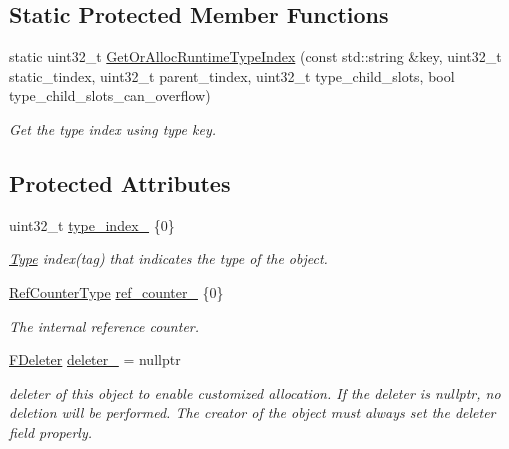 \subsection*{Static Protected Member Functions}
\begin{DoxyCompactItemize}
\item 
static uint32\+\_\+t \hyperlink{classtvm_1_1runtime_1_1Object_a726972ff315c446192df94027ddea032}{Get\+Or\+Alloc\+Runtime\+Type\+Index} (const std\+::string \&key, uint32\+\_\+t static\+\_\+tindex, uint32\+\_\+t parent\+\_\+tindex, uint32\+\_\+t type\+\_\+child\+\_\+slots, bool type\+\_\+child\+\_\+slots\+\_\+can\+\_\+overflow)
\begin{DoxyCompactList}\small\item\em Get the type index using type key. \end{DoxyCompactList}\end{DoxyCompactItemize}
\subsection*{Protected Attributes}
\begin{DoxyCompactItemize}
\item 
uint32\+\_\+t \hyperlink{classtvm_1_1runtime_1_1Object_a4bfc2586cb55f2af47728187b3256255}{type\+\_\+index\+\_\+} \{0\}
\begin{DoxyCompactList}\small\item\em \hyperlink{classtvm_1_1Type}{Type} index(tag) that indicates the type of the object. \end{DoxyCompactList}\item 
\hyperlink{classtvm_1_1runtime_1_1Object_a55549a6c23987890246248682560a03d}{Ref\+Counter\+Type} \hyperlink{classtvm_1_1runtime_1_1Object_a0d492efee331e2239a093f4b2017c10f}{ref\+\_\+counter\+\_\+} \{0\}
\begin{DoxyCompactList}\small\item\em The internal reference counter. \end{DoxyCompactList}\item 
\hyperlink{classtvm_1_1runtime_1_1Object_a9e84841ca982bff376a978ade0132631}{F\+Deleter} \hyperlink{classtvm_1_1runtime_1_1Object_af4407d2b59132e803ff791482dbe0145}{deleter\+\_\+} = nullptr
\begin{DoxyCompactList}\small\item\em deleter of this object to enable customized allocation. If the deleter is nullptr, no deletion will be performed. The creator of the object must always set the deleter field properly. \end{DoxyCompactList}\end{DoxyCompactItemize}
